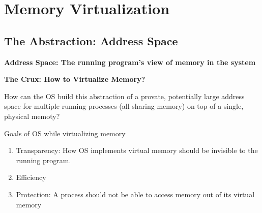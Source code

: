 \chapter{Memory Virtualization}

\section{The Abstraction: Address Space}

\textbf{Address Space: The running program's view of memory in the system}

\begin{tcolorbox}
    \textbf{The Crux: How to Virtualize Memory?}

    How can the OS build this abstraction of a provate, potentially large
    address space for multiple running processes (all sharing memory) on 
    top of a single, physical memoty?
\end{tcolorbox}

Goals of OS while virtualizing memory

\begin{enumerate}
    \item Transparency: How OS implements virtual memory should be invisible
        to the running program.
    \item Efficiency
    \item Protection: A process should not be able to access memory out of
        its virtual memory
\end{enumerate}
